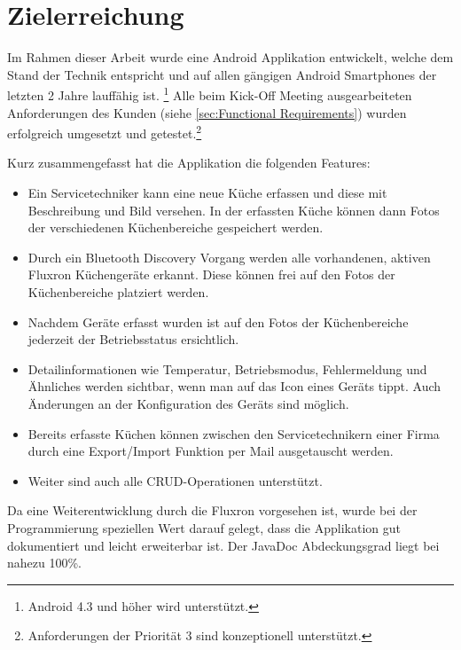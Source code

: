 \section{Zielerreichung}

Im Rahmen dieser Arbeit wurde eine Android Applikation entwickelt, welche dem Stand der Technik entspricht und auf allen gängigen Android Smartphones der letzten 2 Jahre lauffähig ist. \footnote{Android 4.3 und höher wird unterstützt.} Alle beim Kick-Off Meeting ausgearbeiteten Anforderungen des Kunden (siehe \ref{sec:Functional Requirements}) wurden erfolgreich umgesetzt und getestet.\footnote{Anforderungen der Priorität 3 sind konzeptionell unterstützt.}

Kurz zusammengefasst hat die Applikation die folgenden Features:

\begin{itemize}
\item Ein Servicetechniker kann eine neue Küche erfassen und diese mit Beschreibung und Bild versehen. In der erfassten Küche können dann Fotos der verschiedenen Küchenbereiche gespeichert werden. 
\item Durch ein Bluetooth Discovery Vorgang werden alle vorhandenen, aktiven Fluxron Küchengeräte erkannt. Diese können frei auf den Fotos der Küchenbereiche platziert werden.
\item Nachdem Geräte erfasst wurden ist auf den Fotos der Küchenbereiche jederzeit der Betriebsstatus ersichtlich. 
\item Detailinformationen wie Temperatur, Betriebsmodus, Fehlermeldung und Ähnliches werden sichtbar, wenn man auf das Icon eines Geräts tippt. Auch Änderungen an der Konfiguration des Geräts sind möglich.
\item Bereits erfasste Küchen können zwischen den Servicetechnikern einer Firma durch eine Export/Import Funktion per Mail ausgetauscht werden.
\item Weiter sind auch alle \ac{CRUD}-Operationen unterstützt.
\end{itemize}

Da eine Weiterentwicklung durch die Fluxron vorgesehen ist, wurde bei der Programmierung speziellen Wert darauf gelegt, dass die Applikation gut dokumentiert und leicht erweiterbar ist. Der JavaDoc Abdeckungsgrad liegt bei nahezu 100\%.